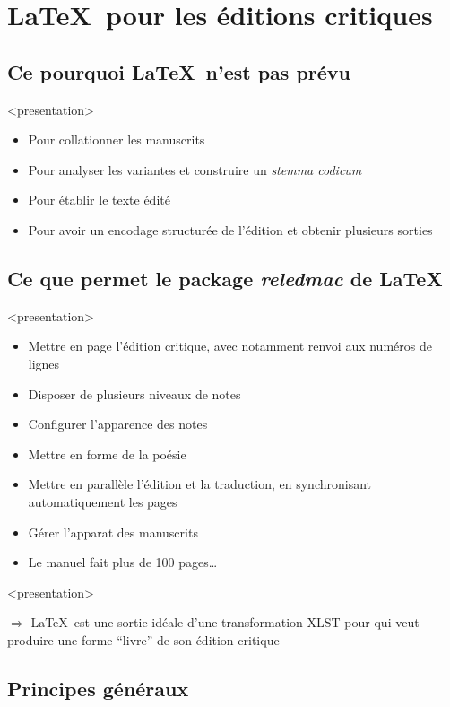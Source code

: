 \documentclass[transnotheorems,noamsthm]{beamer}
\newenvironment{slide}{%
  \begin{frame}
  <presentation>\mode<presentation>{\frametitle{\insertsubsection}}%
  }%
  {\end{frame}}
\begin{document}
\section{\LaTeX\ pour les éditions critiques}
\subsection{Ce pourquoi \LaTeX\ n'est pas prévu}

\begin{slide}
  \begin{itemize}
    \item Pour collationner les manuscrits
    \item Pour analyser les variantes et construire un \emph{stemma codicum}
    \item Pour établir le texte édité
    \item Pour avoir un encodage structurée de l'édition et obtenir plusieurs sorties
  \end{itemize}
\end{slide}
\subsection{Ce que permet le package \emph{reledmac} de \LaTeX}

\begin{slide}
  \begin{itemize}
    \item Mettre en page l'édition critique, avec notamment renvoi aux numéros de lignes
    \item Disposer de plusieurs niveaux de notes
    \item Configurer l'apparence des notes
    \item Mettre en forme de la poésie
    \item Mettre en parallèle l'édition et la traduction, en synchronisant automatiquement les pages
    \item Gérer l'apparat des manuscrits
    \item Le manuel fait plus de 100 pages\ldots
  \end{itemize}
\end{slide}

\begin{slide}
  \alert{$\Longrightarrow$}  \LaTeX\  est une sortie idéale d'une transformation XLST pour qui veut produire une forme \enquote{livre} de son édition critique
\end{slide}
\subsection{Principes généraux}
\end{document}
